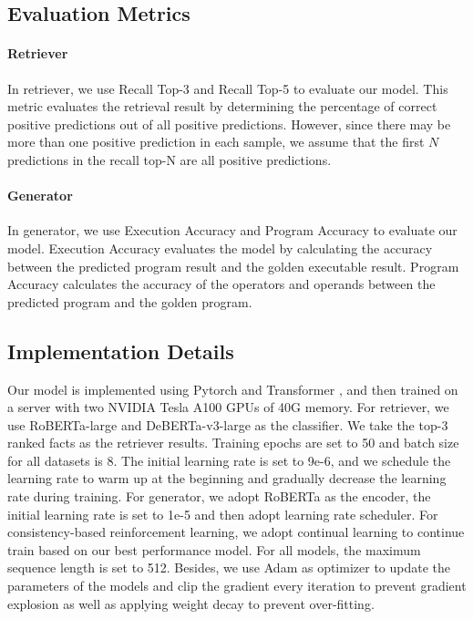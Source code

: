 \documentclass[11pt]{article}
\begin{document}
\subsection{Evaluation Metrics}
 \paragraph{Retriever}
In retriever, we use Recall Top-3 and Recall Top-5 to evaluate our model. This metric evaluates the retrieval result by determining the percentage of correct positive predictions out of all positive predictions. However, since there may be more than one positive prediction in each sample, we assume that the first $N$ predictions in the recall top-N are all positive predictions.
\paragraph{Generator}
In generator, we use Execution Accuracy and Program Accuracy to evaluate our model. Execution Accuracy evaluates the model by calculating the accuracy between the predicted program result and the golden executable result. Program Accuracy calculates the accuracy of the operators and operands between the predicted program and the golden program.


\subsection{Implementation Details}
Our model is implemented using Pytorch \cite{paszke2019pytorch} and Transformer \cite{wolf2020transformers}, and then trained on a server with two NVIDIA Tesla A100 GPUs of 40G memory. For retriever, we use RoBERTa-large and DeBERTa-v3-large as the classifier. We take the top-3 ranked facts as the retriever results. Training epochs are set to 50 and batch size for all datasets is 8. The initial learning rate is set to 9e-6, and we schedule the learning rate to warm up at the beginning and gradually decrease the learning rate during training. For generator, we adopt RoBERTa as the encoder, the initial learning rate is set to 1e-5 and then adopt learning rate scheduler. For consistency-based reinforcement learning, we adopt continual learning to continue train based on our best performance model. For all models, the maximum sequence length is set to 512. Besides, we use Adam as optimizer \cite{kingma2014adam} to update the parameters of the models and clip the gradient every iteration to prevent gradient explosion as well as applying weight decay to prevent over-fitting. 
\end{document}
